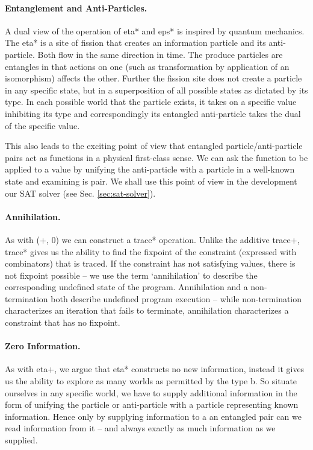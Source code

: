 \documentclass[preprint]{sigplanconf}
\begin{document}
\paragraph*{Entanglement and Anti-Particles.}
A dual view of the operation of {{eta*}} and {{eps*}} is inspired by
quantum mechanics. The {{eta*}} is a site of fission that creates an
information particle and its anti-particle. Both flow in the same
direction in time. The produce particles are entangles in that actions
on one (such as transformation by application of an isomorphism)
affects the other. Further the fission site does not create a particle
in any specific state, but in a superposition of all possible states
as dictated by its type. In each possible world that the particle
exists, it takes on a specific value inhibiting its type and
correspondingly its entangled anti-particle takes the dual of the
specific value.

This also leads to the exciting point of view that entangled
particle/anti-particle pairs act as functions in a physical
first-class sense. We can ask the function to be applied to a value by
unifying the anti-particle with a particle in a well-known state and
examining is pair. We shall use this point of view in the development
our SAT solver (see Sec. \ref{sec:sat-solver}).

\paragraph*{Annihilation.}
As with {{(+, 0)}} we can construct a {{trace*}} operation. Unlike the
additive {{trace+}}, {{trace*}} gives us the ability to find the
fixpoint of the constraint (expressed with combinators) that is
traced. If the constraint has not satisfying values, there is not
fixpoint possible -- we use the term `annihilation' to describe the
corresponding undefined state of the program. Annihilation and a
non-termination both describe undefined program execution -- while
non-termination characterizes an iteration that fails to terminate,
annihilation characterizes a constraint that has no fixpoint. 

\paragraph*{Zero Information.}
As with {{eta+}}, we argue that {{eta*}} constructs no new
information, instead it gives us the ability to explore as many worlds
as permitted by the type {{b}}. So situate ourselves in any specific
world, we have to supply additional information in the form of
unifying the particle or anti-particle with a particle representing
known information. Hence only by supplying information to a an
entangled pair can we read information from it -- and always exactly
as much information as we supplied.
\end{document}
